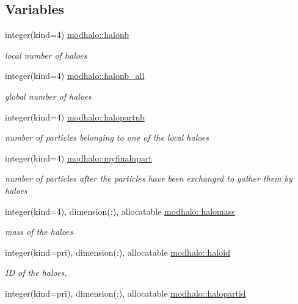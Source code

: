 \subsection*{Variables}
\begin{DoxyCompactItemize}
\item 
integer(kind=4) \hyperlink{namespacemodhalo_a7a64076c8448a822872da06cfb3e98f6}{modhalo\+::halonb}
\begin{DoxyCompactList}\small\item\em local number of haloes \end{DoxyCompactList}\item 
integer(kind=4) \hyperlink{namespacemodhalo_a8e5ab9d4d7316b9c26af34ac45a088ef}{modhalo\+::halonb\+\_\+all}
\begin{DoxyCompactList}\small\item\em global number of haloes \end{DoxyCompactList}\item 
integer(kind=4) \hyperlink{namespacemodhalo_a026b99d5d7dc52fa2755b516c9947514}{modhalo\+::halopartnb}
\begin{DoxyCompactList}\small\item\em number of particles belonging to one of the local haloes \end{DoxyCompactList}\item 
integer(kind=4) \hyperlink{namespacemodhalo_a52f1f25dcc26f652f137e54813e02309}{modhalo\+::myfinalnpart}
\begin{DoxyCompactList}\small\item\em number of particles after the particles have been exchanged to gather them by haloes \end{DoxyCompactList}\item 
integer(kind=4), dimension(\+:), allocatable \hyperlink{namespacemodhalo_a22da1dc93c68210ac3c692f1fb545bc0}{modhalo\+::halomass}
\begin{DoxyCompactList}\small\item\em mass of the haloes \end{DoxyCompactList}\item 
integer(kind=pri), dimension(\+:), allocatable \hyperlink{namespacemodhalo_a28d1d14569d3cd370d375aca76fd838c}{modhalo\+::haloid}
\begin{DoxyCompactList}\small\item\em ID of the haloes. \end{DoxyCompactList}\item 
integer(kind=pri), dimension(\+:), allocatable \hyperlink{namespacemodhalo_a6c47abc5102dc629247c7b90831b1030}{modhalo\+::halopartid}

\end{DoxyCompactItemize}

